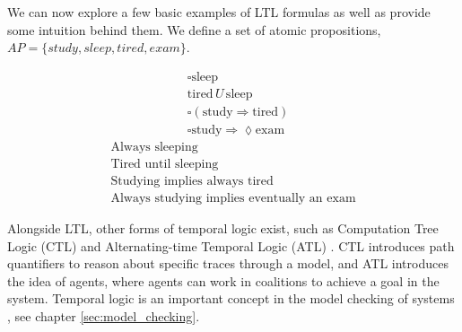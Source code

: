 \par
We can now explore a few basic examples of LTL formulas as well as provide some intuition behind them. We define a set of atomic propositions, $AP = \{study, sleep, tired, exam\}$.
\begin{multicols}{2}
    \[
    \begin{aligned}
    &\square \text{sleep} \\
    &\text{tired} \, U \, \text{sleep} \\
    &\square (\text{study} \Rightarrow \text{tired}) \\
    &\square \text{study} \Rightarrow \lozenge \text{exam}
    \end{aligned}
    \]
    \vline
    \[
    \begin{aligned}
    \text{Always sleeping} \\
    \text{Tired until sleeping} \\
    \text{Studying implies always tired} \\
    \text{Always studying implies eventually an exam}
    \end{aligned}
    \]
    \end{multicols}
\par
Alongside LTL, other forms of temporal logic exist, such as Computation Tree Logic (CTL) \cite{temporal_and_modal_logic} and Alternating-time Temporal Logic (ATL) \cite{atl}. CTL introduces path quantifiers to reason about specific traces through a model, and ATL introduces the idea of agents, where agents can work in coalitions to achieve a goal in the system. Temporal logic is an important concept in the model checking of systems \cite{principles_of_model_checking}, see chapter \ref{sec:model_checking}. 
